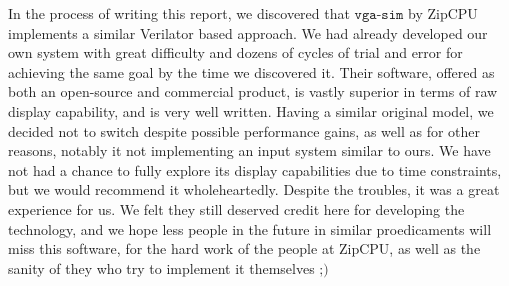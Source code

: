 In the process of writing this report, we discovered that \(\texttt{vga-sim}\)
by ZipCPU \cite{vgasimzip} implements a similar Verilator based approach. We had
already developed our own system with great difficulty and dozens of cycles of 
trial and error for achieving the same goal by the time we discovered it. Their
software, offered as both an open-source and commercial product, is vastly superior 
in terms of raw display capability, and is very well written. Having a similar 
original model, we decided not to switch despite possible performance gains, as well
as for other reasons, notably it not implementing an input system similar to ours.
We have not had a chance to fully explore its display capabilities due to time
constraints, but we would recommend it wholeheartedly. Despite the troubles,
it was a great experience for us.
We felt they still deserved credit here for developing the technology, and we hope
less people in the future in similar proedicaments will miss this software, 
for the hard work of the people at ZipCPU, as well as the sanity of they
who try to implement it themselves \(\textsf{;)}\)  